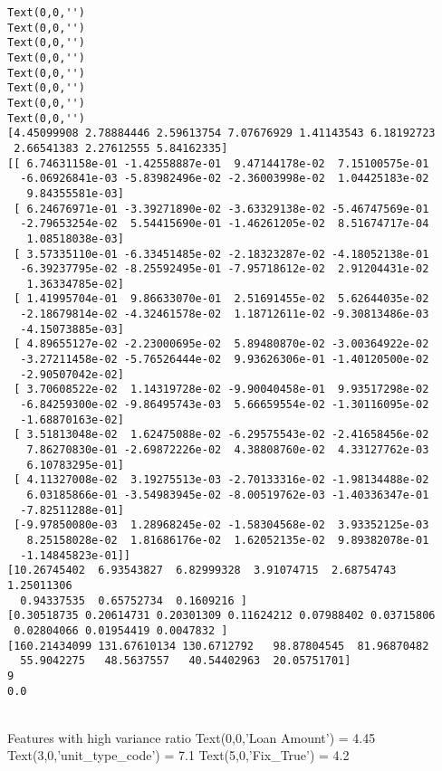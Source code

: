 \documentclass[11pt]{article}
\begin{document}
    \begin{Verbatim}[commandchars=\\\{\}]
Text(0,0,'')
Text(0,0,'')
Text(0,0,'')
Text(0,0,'')
Text(0,0,'')
Text(0,0,'')
Text(0,0,'')
Text(0,0,'')
[4.45099908 2.78884446 2.59613754 7.07676929 1.41143543 6.18192723
 2.66541383 2.27612555 5.84162335]
[[ 6.74631158e-01 -1.42558887e-01  9.47144178e-02  7.15100575e-01
  -6.06926841e-03 -5.83982496e-02 -2.36003998e-02  1.04425183e-02
   9.84355581e-03]
 [ 6.24676971e-01 -3.39271890e-02 -3.63329138e-02 -5.46747569e-01
  -2.79653254e-02  5.54415690e-01 -1.46261205e-02  8.51674717e-04
   1.08518038e-03]
 [ 3.57335110e-01 -6.33451485e-02 -2.18323287e-02 -4.18052138e-01
  -6.39237795e-02 -8.25592495e-01 -7.95718612e-02  2.91204431e-02
   1.36334785e-02]
 [ 1.41995704e-01  9.86633070e-01  2.51691455e-02  5.62644035e-02
  -2.18679814e-02 -4.32461578e-02  1.18712611e-02 -9.30813486e-03
  -4.15073885e-03]
 [ 4.89655127e-02 -2.23000695e-02  5.89480870e-02 -3.00364922e-02
  -3.27211458e-02 -5.76526444e-02  9.93626306e-01 -1.40120500e-02
  -2.90507042e-02]
 [ 3.70608522e-02  1.14319728e-02 -9.90040458e-01  9.93517298e-02
  -6.84259300e-02 -9.86495743e-03  5.66659554e-02 -1.30116095e-02
  -1.68870163e-02]
 [ 3.51813048e-02  1.62475088e-02 -6.29575543e-02 -2.41658456e-02
   7.86270830e-01 -2.69872226e-02  4.38808760e-02  4.33127762e-03
   6.10783295e-01]
 [ 4.11327008e-02  3.19275513e-03 -2.70133316e-02 -1.98134488e-02
   6.03185866e-01 -3.54983945e-02 -8.00519762e-03 -1.40336347e-01
  -7.82511288e-01]
 [-9.97850080e-03  1.28968245e-02 -1.58304568e-02  3.93352125e-03
   8.25158028e-02  1.81686176e-02  1.62052135e-02  9.89382078e-01
  -1.14845823e-01]]
[10.26745402  6.93543827  6.82999328  3.91074715  2.68754743  1.25011306
  0.94337535  0.65752734  0.1609216 ]
[0.30518735 0.20614731 0.20301309 0.11624212 0.07988402 0.03715806
 0.02804066 0.01954419 0.0047832 ]
[160.21434099 131.67610134 130.6712792   98.87804545  81.96870482
  55.9042275   48.5637557   40.54402963  20.05751701]
9
0.0

    \end{Verbatim}

    \begin{center}
    \end{center}
    { \hspace*{\fill} \\}
    Features with high variance ratio
Text(0,0,'Loan Amount')     = 4.45
Text(3,0,'unit_type_code')  = 7.1
Text(5,0,'Fix_True')        = 4.2
\end{document}
